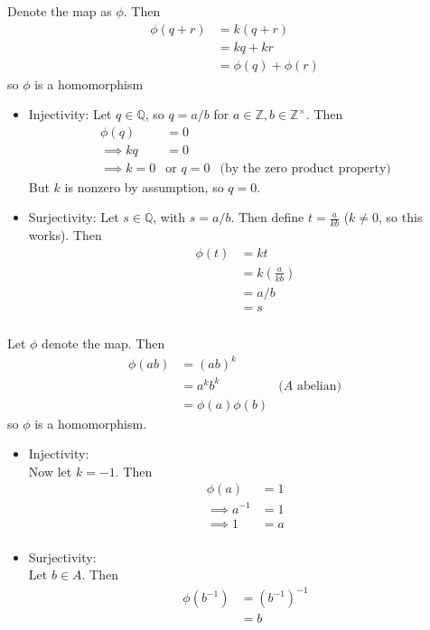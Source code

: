 \documentclass{article}
\newcommand{\ints}{\mathbb{Z}}
\newcommand{\rats}{\mathbb{Q}}
\newcommand{\inv}[1]{ {#1}^{-1} }
\begin{document}
\subsubsection{}\label{6p21}
Denote the map as $\phi$. Then
\begin{align*}
\phi(q + r) &= k(q+r)\\
&= kq + kr\\
&= \phi(q) + \phi(r)
\end{align*}
so $\phi$ is a homomorphism\\
\begin{itemize}
\item Injectivity:
Let $q \in \rats$, so $q = a/b$ for $a\in \ints, b\in\ints^{\times}$. Then\\
\begin{align*}
\phi(q) &= 0\\
\implies kq &= 0\\
\implies k = 0 &\mbox{or } q = 0 &\mbox{(by the zero product property)}
\end{align*}
But $k$ is nonzero by assumption, so $q=0$. 
\item Surjectivity:
Let $s\in\rats$, with $s=a/b$. Then define $t=\frac{a}{kb}$ ($k\neq 0$, so this works). Then
\begin{align*}
\phi(t) &= kt\\
&= k(\frac{a}{kb})\\
&= a/b\\
&= s
\end{align*}
\end{itemize}
\subsubsection{}\label{ex6p22}
Let $\phi$ denote the map. Then 
\begin{align*}
\phi(ab) &= (ab)^k\\
&= a^kb^k & \mbox{($A$ abelian)}\\
&= \phi(a)\phi(b)
\end{align*}
so $\phi$ is a homomorphism.

\begin{itemize}
\item Injectivity:\\
Now let $k = -1$. Then 
\begin{align*}
\phi(a) &= 1\\
\implies \inv{a} &= 1\\
\implies 1 &= a\\
\end{align*}

\item Surjectivity:\\
Let $b \in A$. Then
\begin{align*}
\phi(\inv{b}) &= \inv{(\inv{b})}\\
&= b
\end{align*}
\end{itemize}
\end{document}
